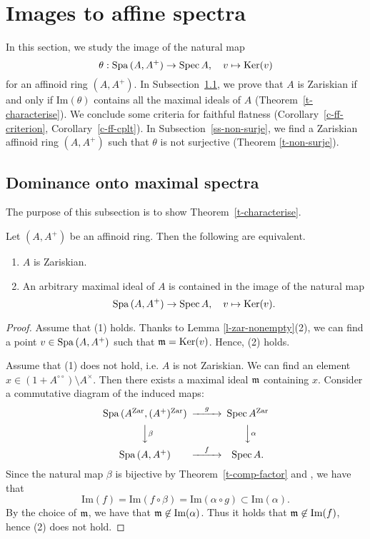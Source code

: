 



\section{Images to affine spectra}

In this section, we study the image of the natural map 
$$\theta:{\operatorname{Spa}}\,(A, A^+) \to {\operatorname{Spec}}\,A, \quad v \mapsto {\operatorname{Ker}}(v)$$
for an affinoid ring $(A, A^+)$. 
In Subsection~\ref{ss-characterise}, 
we prove that $A$ is Zariskian 
if and only if $\text{Im}(\theta)$ contains all the maximal ideals of $A$ (Theorem~\ref{t-characterise}). 
We conclude some criteria for faithful flatness 
(Corollary~\ref{c-ff-criterion}, Corollary~\ref{c-ff-cplt}). 
In Subsection~\ref{ss-non-surje}, 
we find a Zariskian affinoid ring $(A, A^+)$ such that 
$\theta$ is not surjective (Theorem \ref{t-non-surje}). 



\subsection{Dominance onto maximal spectra}\label{ss-characterise}


The purpose of this subsection is to show Theorem~\ref{t-characterise}. 






\begin{thm}\label{t-characterise}
Let $(A, A^+)$ be an affinoid ring. 
Then the following are equivalent. 
\begin{enumerate}
\item 
$A$ is Zariskian. 
\item 
An arbitrary maximal ideal of $A$ is contained in the image of 
the natural map 
$${\operatorname{Spa}}\,(A, A^+) \to {\operatorname{Spec}}\,A, \quad v \mapsto {\operatorname{Ker}}(v).$$
\end{enumerate}
\end{thm}

\begin{proof}
Assume that (1) holds. 
Thanks to Lemma \ref{l-zar-nonempty}(2), 
we can find a point $v \in {\operatorname{Spa}}\,(A, A^+)$ such that $\mathfrak{m}={\operatorname{Ker}}(v)$. 
Hence, (2) holds. 






Assume that (1) does not hold, i.e. $A$ is not Zariskian. 
We can find an element 
$x \in (1+A^{\circ\circ}) \setminus A^{\times}$. 
Then there exists a maximal ideal $\mathfrak{m}$ containing $x$. 
Consider a commutative diagram of the induced maps: 
$$\begin{CD}
\Spa\,(A^{\Zar}, (A^+)^{\Zar}) @>g >> \Spec\,A^{\Zar}\\
@VV\beta V @VV \alpha V\\
\Spa\,(A, A^+) @>f >> \Spec\,A.
\end{CD}$$
Since the natural map $\beta$ is bijective by Theorem~\ref{t-comp-factor} and \cite[Proposition 3.9]{Hub93}, 
we have that 
$$\text{Im}(f)=\text{Im}(f \circ \beta)=\text{Im}(\alpha \circ g) 
\subset \text{Im}(\alpha).$$
By the choice of $\mathfrak{m}$, we have that $\mathfrak{m} \not\in \text{Im}(\alpha)$. 
Thus it holds that $\mathfrak{m} \not\in \text{Im}(f)$, hence (2) does not hold. 
\end{proof}


